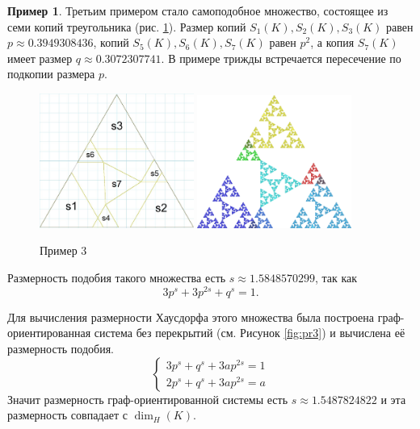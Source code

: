 \documentclass[a4paper,14pt]{extarticle} %
\newcommand{\0}{\varnothing}
\newcommand{\8}{\infty}
\theoremstyle{definition}
\newtheorem{example}{Пример}
\begin{document}
\begin{example}\label{ex:3}
Третьим примером  стало самоподобное множество, состоящее из семи копий треугольника (рис. \ref{fig:pr3_скелет}).
Размер копий $S_1(K), S_2(K), S_3(K)$ равен $p\approx0.3949308436$, копий $S_5(K), S_6(K), S_7(K)$ равен $p^2$, а копия $S_7(K)$ имеет размер $q\approx0.3072307741$.
В примере трижды встречается пересечение по подкопии размера $p$.

\begin{figure}[H]
    \centering
    \includegraphics[width=0.45\textwidth]{den_tr_скелет.png}
    \hfill
    \includegraphics[width=0.45\textwidth]{den_tr.png}
    \caption{Пример 3}
    \label{fig:pr3_скелет}
\end{figure}

Размерность подобия такого множества есть $s\approx1.5848570299$, так как
$$3p^s + 3p^{2s} + q^s = 1.$$

Для вычисления размерности Хаусдорфа этого множества была построена граф-ориентированная система без перекрытий (см. Рисунок \ref{fig:pr3}) и вычислена её размерность подобия.
$$
\begin{cases}
3p^s + q^s + 3ap^{2s} = 1\\
2p^s + q^s + 3ap^{2s} = a
\end{cases}
$$
Значит размерность граф-ориентированной системы есть $s\approx1.5487824822$ и эта размерность совпадает с $\dim_H(K)$.


\end{example}
\end{document}
